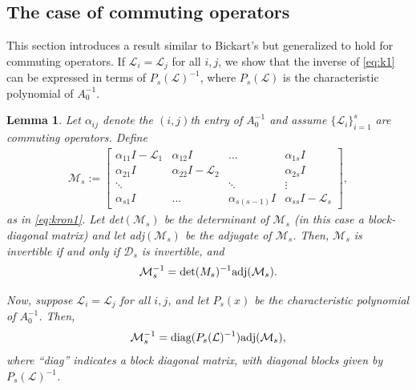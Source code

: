 \documentclass[a4paper,10pt]{article}
\newtheorem{lemma}{Lemma}
\begin{document}
\subsection{The case of commuting operators}

This section introduces a result similar to Bickart's but generalized to hold for commuting
operators. If $\mathcal{L}_i=\mathcal{L}_j$ for all $i,j$, we show that the inverse of
\eqref{eq:k1} can be expressed in terms of $P_s(\mathcal{L})^{-1}$, where $P_s(\mathcal{L})$
is the characteristic polynomial of $A_0^{-1}$.

%
\begin{lemma}
Let $\alpha_{ij}$ denote the $(i,j)$th entry of $A_0^{-1}$ and assume $\{\mathcal{L}_i\}_{i=1}^s$
are commuting operators. Define 
\begin{align}\label{eq:k1}
\mathcal{M}_s := \begin{bmatrix} \alpha_{11}I - \mathcal{L}_1 & \alpha_{12}I & ... & \alpha_{1s}I \\
	\alpha_{21}I & \alpha_{22}I - \mathcal{L}_2 & & \alpha_{2s}I \\
	\ddots & & \ddots & \vdots \\ \alpha_{s1}I & ... & \alpha_{s(s-1)}I & \alpha_{ss}I - \mathcal{L}_s \end{bmatrix},
\end{align}
as in \eqref{eq:kron1}.
Let det$(\mathcal{M}_s)$ be the determinant of $\mathcal{M}_s$ (in this case a block-diagonal
matrix) and let adj$(\mathcal{M}_s)$ be the adjugate of $\mathcal{M}_s$. Then, $\mathcal{M}_s$
is invertible if and only if $\mathcal{D}_s$ is invertible, and
\begin{align*}
\mathcal{M}_s^{-1} = \textnormal{det}({M}_s)^{-1}\textnormal{adj}(\mathcal{M}_s).
\end{align*}

Now, suppose $\mathcal{L}_i = \mathcal{L}_j$ for all $i,j$, and let $P_s(x)$ be the
characteristic polynomial of $A_0^{-1}$. Then,
\begin{align*}
\mathcal{M}_s^{-1} = \textnormal{diag}(P_s(\mathcal{L})^{-1})\textnormal{adj}(\mathcal{M}_s),
\end{align*}
where ``diag'' indicates a block diagonal matrix, with diagonal blocks given by $P_s(\mathcal{L})^{-1}$.
\end{lemma}
\end{document}
